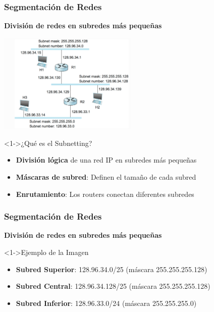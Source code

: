 \documentclass[aspectratio=169]{beamer}
\begin{document}
\begin{frame}
\frametitle{Segmentación de Redes}

\begin{center}
\Large \textbf{División de redes en subredes más pequeñas}
\end{center}

\begin{center}
\includegraphics[width=0.5\textwidth]{figuras/image7.png}
\end{center}

\begin{block}<1->{¿Qué es el Subnetting?}
\begin{itemize}
\item<1-> \textbf{División lógica} de una red IP en subredes más pequeñas
\item<2-> \textbf{Máscaras de subred}: Definen el tamaño de cada subred
\item<3-> \textbf{Enrutamiento}: Los routers conectan diferentes subredes
\end{itemize}
\end{block}
\end{frame}

\begin{frame}
\frametitle{Segmentación de Redes}

\begin{center}
            \Large \textbf{División de redes en subredes más pequeñas}
            \end{center}
        
            
        \begin{block}<1->{Ejemplo de la Imagen}
        \begin{itemize}
        \item<2-> \textbf{Subred Superior}: 128.96.34.0/25 (máscara 255.255.255.128)
        \item<3-> \textbf{Subred Central}: 128.96.34.128/25 (máscara 255.255.255.128)
        \item<4-> \textbf{Subred Inferior}: 128.96.33.0/24 (máscara 255.255.255.0)
        \end{itemize}
        \end{block}
        \end{frame}
\end{document}
